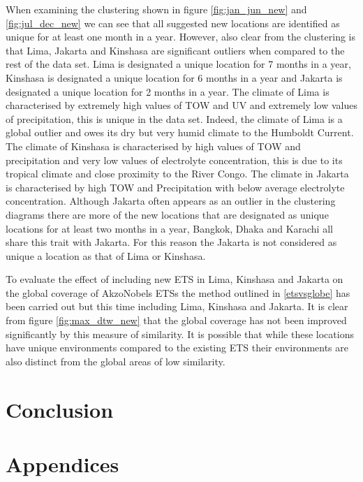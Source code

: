 \documentclass{article}
\begin{document}
When examining the clustering shown in figure \ref{fig:jan_jun_new} and \ref{fig:jul_dec_new} we can see that all suggested new locations are identified as unique for at least one month in a year. However, also clear from the clustering is that Lima, Jakarta and Kinshasa are significant outliers when compared to the rest of the data set. Lima is designated a unique location for 7 months in a year, Kinshasa is designated a unique location for 6 months in a year and Jakarta is designated a unique location for 2 months in a year. The climate of Lima is characterised by extremely high values of TOW and UV and extremely low values of precipitation, this is unique in the data set. Indeed, the climate of Lima is a global outlier and owes its dry but very humid climate to the Humboldt Current\citep{}. The climate of Kinshasa is characterised by high values of TOW and precipitation and very low values of electrolyte concentration, this is due to its tropical climate and close proximity to the River Congo. The climate in Jakarta is characterised by high TOW and Precipitation with below average electrolyte concentration. Although Jakarta often appears as an outlier in the clustering diagrams there are more of the new locations that are designated as unique locations for at least two months in a year, Bangkok, Dhaka and Karachi all share this trait with Jakarta. For this reason the Jakarta is not considered as unique a location as that of Lima or Kinshasa. 

To evaluate the effect of including new ETS in Lima, Kinshasa and Jakarta on the global coverage of AkzoNobels ETSs the method outlined in \ref{etsvsglobe} has been carried out but this time including Lima, Kinshasa and Jakarta. It is clear from figure \ref{fig:max_dtw_new} that the global coverage has not been improved significantly by this measure of similarity. It is possible that while these locations have unique environments compared to the existing ETS their environments are also distinct from the global areas of low similarity. 

\section{Conclusion}


\newpage
\section{Appendices}
\end{document}
